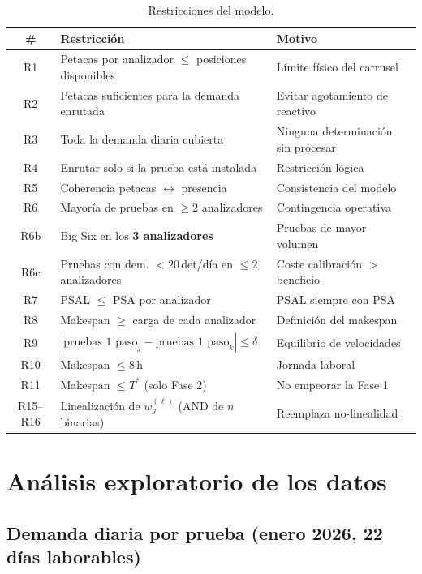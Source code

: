 \documentclass[12pt, a4paper]{article}
\begin{document}
\begin{table}[H]
\centering
\caption{Restricciones del modelo.}
\begin{tabularx}{\linewidth}{clX}
\toprule
\textbf{\#} & \textbf{Restricción} & \textbf{Motivo} \\
\midrule
R1  & Petacas por analizador $\leq$ posiciones disponibles & Límite físico del carrusel \\
R2  & Petacas suficientes para la demanda enrutada & Evitar agotamiento de reactivo \\
R3  & Toda la demanda diaria cubierta & Ninguna determinación sin procesar \\
R4  & Enrutar solo si la prueba está instalada & Restricción lógica \\
R5  & Coherencia petacas $\leftrightarrow$ presencia & Consistencia del modelo \\
R6  & Mayoría de pruebas en $\geq 2$ analizadores & Contingencia operativa \\
R6b & Big Six en los \textbf{3 analizadores} & Pruebas de mayor volumen \\
R6c & Pruebas con dem. $< 20$\,det/día en $\leq 2$ analizadores & Coste calibración $>$ beneficio \\
R7  & PSAL $\leq$ PSA por analizador & PSAL siempre con PSA \\
R8  & Makespan $\geq$ carga de cada analizador & Definición del makespan \\
R9  & $|\text{pruebas 1 paso}_j - \text{pruebas 1 paso}_k| \leq \delta$ & Equilibrio de velocidades \\
R10 & Makespan $\leq 8$\,h & Jornada laboral \\
R11 & Makespan $\leq T^*$ (solo Fase 2) & No empeorar la Fase 1 \\
R15--R16 & Linealización de $w_g^{(\ell)}$ (AND de $n$ binarias) & Reemplaza no-linealidad \\
\bottomrule
\end{tabularx}
\end{table}

\clearpage
\section{Análisis exploratorio de los datos}

\subsection{Demanda diaria por prueba (enero 2026, 22 días laborables)}
\end{document}
